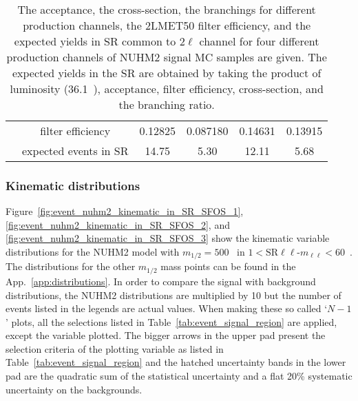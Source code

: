 \begin{table}[p]
{{\begin{tabular}{cccccc}
                                         & filter efficiency     & 0.12825                                    & 0.087180                                       & 0.14631                                    & 0.13915\\
                                         & expected events in SR & 14.75                                      & 5.30                                           & 12.11                                      & 5.68\\
                \hline
                \hline
            \end{tabular}
        }
    }
    \caption{The acceptance, the cross-section, the branchings for different production channels, the 2LMET50 filter efficiency, and the expected yields in SR common to $2\ell$ channel for four different production channels of NUHM2 signal MC samples are given.
    The expected yields in the SR are obtained by taking the product of luminosity (36.1~\ifb), acceptance, filter efficiency, cross-section, and the branching ratio.}
    \label{tab:event_nuhm2_truth3}
\end{table}%


\subsubsection{Kinematic distributions}
\label{subsubsec:event_kinematic_distributions}
Figure~\ref{fig:event_nuhm2_kinematic_in_SR_SFOS_1}, \ref{fig:event_nuhm2_kinematic_in_SR_SFOS_2}, and \ref{fig:event_nuhm2_kinematic_in_SR_SFOS_3} show the kinematic variable distributions for the NUHM2 model with $m_{1/2} = 500$~{\GeV} in $1 < \mathrm{SR}\ell \ell$-$m_{\ell \ell} < 60$~{\GeV}.
The distributions for the other $m_{1/2}$ mass points can be found in the App.~\ref{app:distributions}.
In order to compare the signal with background distributions, the NUHM2 distributions are multiplied by 10 but the number of events listed in the legends are actual values.
When making these so called `$N-1$' plots, all the selections listed in Table~\ref{tab:event_signal_region} are applied, except the variable plotted.
The bigger arrows in the upper pad present the selection criteria of the plotting variable as listed in Table~\ref{tab:event_signal_region} and the hatched uncertainty bands in the lower pad are the quadratic sum of the statistical uncertainty and a flat 20\% systematic uncertainty on the backgrounds.


